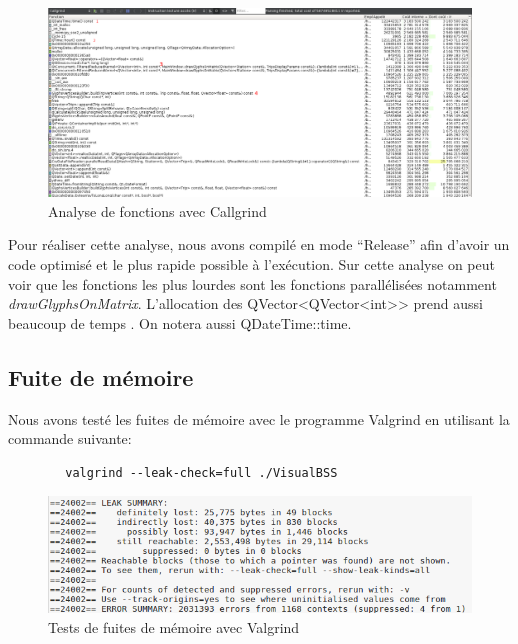 \documentclass[12pt]{article}
\begin{document}
		\begin{figure}[!h]
		\begin{center}
		\includegraphics[scale=.3]{callgrind_analyse_avec_numero.png}
		\caption{Analyse de fonctions avec Callgrind}
		\label{fig:callgrind}
		\end{center}
		\end{figure}
	
		Pour réaliser cette analyse, nous avons compilé en mode “Release” afin d’avoir
		un code optimisé et le plus rapide possible à l’exécution.
		Sur cette analyse on peut voir que les fonctions les plus lourdes sont les fonctions
		parallélisées notamment \textit{drawGlyphsOnMatrix}. L’allocation des QVector<QVector<int>>
		prend aussi beaucoup de temps . On notera aussi QDateTime::time.
		
		\subsection{Fuite de mémoire}
		Nous avons testé les fuites de mémoire avec le programme Valgrind en utilisant la
		commande suivante:
	
		\begin{verbatim}	
		valgrind --leak-check=full ./VisualBSS
		\end{verbatim}
	
		\begin{figure}[!h]
		\begin{center}
		\includegraphics[scale=.8]{memory_leak.png}
		\caption{Tests de fuites de mémoire avec Valgrind}
		\end{center}
		\end{figure}	
	
\end{document}
